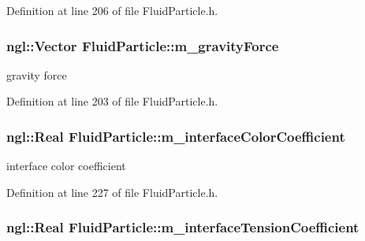 Definition at line 206 of file FluidParticle.h.

\hypertarget{class_fluid_particle_a4759c4e1e0729283a71dec834b753ae1}{
\subsubsection[{m\_\-gravityForce}]{\setlength{\rightskip}{0pt plus 5cm}ngl::Vector {\bf FluidParticle::m\_\-gravityForce}}}
\label{class_fluid_particle_a4759c4e1e0729283a71dec834b753ae1}


gravity force 



Definition at line 203 of file FluidParticle.h.

\hypertarget{class_fluid_particle_ab50ddf6727d5869c5732efe8a59b549d}{
\subsubsection[{m\_\-interfaceColorCoefficient}]{\setlength{\rightskip}{0pt plus 5cm}ngl::Real {\bf FluidParticle::m\_\-interfaceColorCoefficient}}}
\label{class_fluid_particle_ab50ddf6727d5869c5732efe8a59b549d}


interface color coefficient 



Definition at line 227 of file FluidParticle.h.

\hypertarget{class_fluid_particle_ae649e3f7dcf63da1d3fb15c5c00c968d}{
\subsubsection[{m\_\-interfaceTensionCoefficient}]{\setlength{\rightskip}{0pt plus 5cm}ngl::Real {\bf FluidParticle::m\_\-interfaceTensionCoefficient}}}
\label{class_fluid_particle_ae649e3f7dcf63da1d3fb15c5c00c968d}


